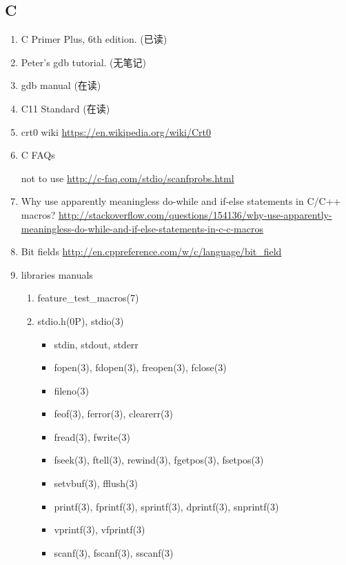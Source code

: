 \documentclass{article}
\begin{document}
\subsection{C}
\begin{enumerate}
    \item C Primer Plus, 6th edition. (已读)
    \item Peter's gdb tutorial. (无笔记)
    \item gdb manual (在读)
    \item C11 Standard (在读)
    \item crt0 wiki \url{https://en.wikipedia.org/wiki/Crt0}
    \item C FAQs
        \begin{itemize}
            not to use  \url{http://c-faq.com/stdio/scanfprobs.html}
        \end{itemize}
    \item Why use apparently meaningless do-while and if-else statements in C/C++ macros?
        \url{http://stackoverflow.com/questions/154136/why-use-apparently-meaningless-do-while-and-if-else-statements-in-c-c-macros}
    \item Bit fields \url{http://en.cppreference.com/w/c/language/bit_field}
    \item libraries manuals
        \begin{enumerate}
            \item feature_test_macros(7)
            \item stdio.h(0P), stdio(3)
                \begin{itemize}
                    \item stdin, stdout, stderr
                    \item fopen(3), fdopen(3), freopen(3), fclose(3)
                    \item fileno(3)
                    \item feof(3), ferror(3), clearerr(3)
                    \item fread(3), fwrite(3)
                    \item fseek(3), ftell(3), rewind(3), fgetpos(3), fsetpos(3)
                    \item setvbuf(3), fflush(3)
                    \item printf(3), fprintf(3), sprintf(3), dprintf(3), snprintf(3)
                    \item vprintf(3), vfprintf(3)
                    \item scanf(3), fscanf(3), sscanf(3)

\end{itemize}
\end{enumerate}
\end{enumerate}
\end{document}
